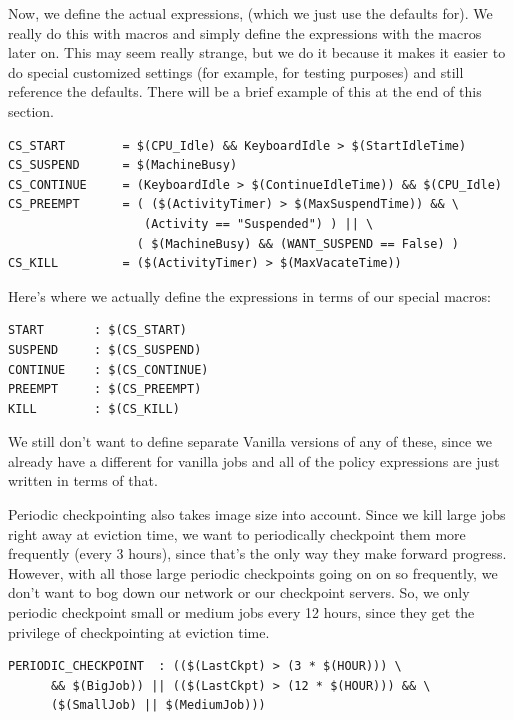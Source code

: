 Now, we define the actual expressions, (which we just use the defaults
for).
We really do this with macros and simply define the expressions with
the macros later on.
This may seem really strange, but we do it because it makes it easier
to do special customized settings (for example, for testing purposes)
and still reference the defaults.
There will be a brief example of this at the end of this section.
\begin{verbatim}
CS_START        = $(CPU_Idle) && KeyboardIdle > $(StartIdleTime)
CS_SUSPEND      = $(MachineBusy)
CS_CONTINUE     = (KeyboardIdle > $(ContinueIdleTime)) && $(CPU_Idle)
CS_PREEMPT      = ( ($(ActivityTimer) > $(MaxSuspendTime)) && \
                   (Activity == "Suspended") ) || \
                  ( $(MachineBusy) && (WANT_SUSPEND == False) )
CS_KILL         = ($(ActivityTimer) > $(MaxVacateTime))
\end{verbatim}

Here's where we actually define the expressions in terms of our
special macros:
\begin{verbatim}
START       : $(CS_START)
SUSPEND     : $(CS_SUSPEND)
CONTINUE    : $(CS_CONTINUE)
PREEMPT     : $(CS_PREEMPT)
KILL        : $(CS_KILL)
\end{verbatim}

We still don't want to define separate Vanilla versions of any of
these, since we already have a different  for
vanilla jobs and all of the policy expressions are just written in
terms of that. 

Periodic checkpointing also takes image size into account.  
Since we kill large jobs right away at eviction time, we want to
periodically checkpoint them more frequently (every 3 hours), since
that's the only way they make forward progress.
However, with all those large periodic checkpoints going on on so
frequently, we don't want to bog down our network or our checkpoint
servers.
So, we only periodic checkpoint small or medium jobs every 12 hours,
since they get the privilege of checkpointing at eviction time.
\begin{verbatim}
PERIODIC_CHECKPOINT  : (($(LastCkpt) > (3 * $(HOUR))) \
      && $(BigJob)) || (($(LastCkpt) > (12 * $(HOUR))) && \
      ($(SmallJob) || $(MediumJob)))
\end{verbatim}

